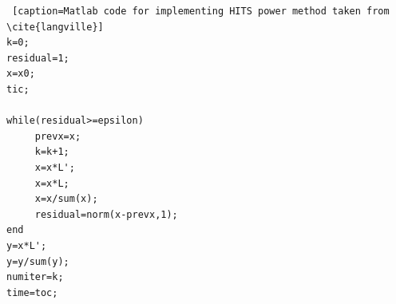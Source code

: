 \documentclass[11pt]{report}
\begin{document}
\begin{appendices}
\begin{lstlisting} [caption=Matlab code for implementing HITS power method taken from \cite{langville}]
k=0;
residual=1;
x=x0;
tic;

while(residual>=epsilon)
     prevx=x;
     k=k+1;
     x=x*L';
     x=x*L;
     x=x/sum(x);
     residual=norm(x-prevx,1);
end
y=x*L';
y=y/sum(y);
numiter=k;
time=toc;

\end{lstlisting}
\end{appendices}
\end{document}
